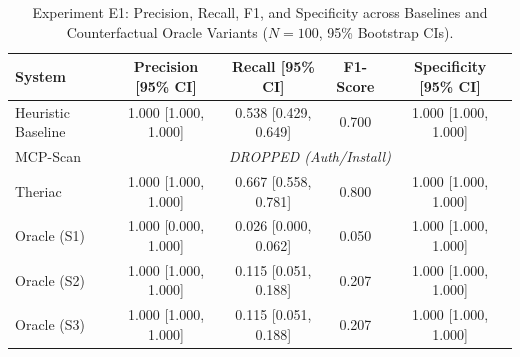\begin{table}[t]
\centering
\caption{Experiment E1: Precision, Recall, F1, and Specificity across Baselines and Counterfactual Oracle Variants ($N=100$, 95\% Bootstrap CIs).}
\label{tab:e1_baselines}
\small
\begin{tabular}{lcccc}
\hline
\textbf{System} & \textbf{Precision [95\% CI]} & \textbf{Recall [95\% CI]} & \textbf{F1-Score} & \textbf{Specificity [95\% CI]} \\
\hline
Heuristic Baseline & 1.000 [1.000, 1.000] & 0.538 [0.429, 0.649] & 0.700 & 1.000 [1.000, 1.000] \\
MCP-Scan & \multicolumn{4}{c}{\textit{DROPPED (Auth/Install)}} \\
Theriac & 1.000 [1.000, 1.000] & 0.667 [0.558, 0.781] & 0.800 & 1.000 [1.000, 1.000] \\
Oracle (S1) & 1.000 [0.000, 1.000] & 0.026 [0.000, 0.062] & 0.050 & 1.000 [1.000, 1.000] \\
Oracle (S2) & 1.000 [1.000, 1.000] & 0.115 [0.051, 0.188] & 0.207 & 1.000 [1.000, 1.000] \\
Oracle (S3) & 1.000 [1.000, 1.000] & 0.115 [0.051, 0.188] & 0.207 & 1.000 [1.000, 1.000] \\
\hline
\end{tabular}
\end{table}
